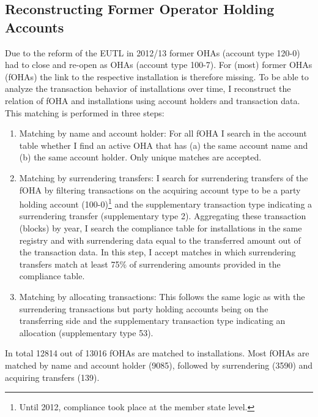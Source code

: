 \documentclass[authoryear]{elsarticle}
\begin{document}
\subsection{Reconstructing Former Operator Holding Accounts}\label{app:reconstruction}

Due to the reform of the EUTL in 2012/13 former OHAs (account type 120-0) had to close and re-open as OHAs (account type 100-7). For (most) former OHAs (fOHAs) the link to the respective installation is therefore missing. To be able to analyze the transaction behavior of installations over time, I reconstruct the relation of fOHA and installations using account holders and transaction data. This matching is performed in three steps:
\begin{enumerate}
	\item Matching by name and account holder: For all fOHA I search in the account table whether I find an active OHA that has (a) the same account name and (b) the same account holder. Only unique matches are accepted.
	\item  Matching by surrendering transfers: I search for surrendering transfers of the fOHA by filtering transactions on the acquiring account type to be a party holding account (100-0)\footnote{Until 2012, compliance took place at the member state level.} and the supplementary transaction type indicating a surrendering transfer (supplementary type 2). Aggregating these transaction (blocks) by year, I search the compliance table for installations in the same registry and with surrendering data equal to the transferred amount out of the transaction data. In this step, I accept matches in which surrendering transfers match at least 75\% of surrendering amounts provided in the compliance table.
	\item Matching by allocating transactions: This follows the same logic as with the surrendering transactions but party holding accounts being on the transferring side and the supplementary transaction type indicating an allocation (supplementary type 53).
\end{enumerate} 

In total 12814 out of 13016 fOHAs are matched to installations. Most fOHAs are matched by name and account holder (9085), followed by surrendering (3590) and acquiring transfers (139).

\end{document}
